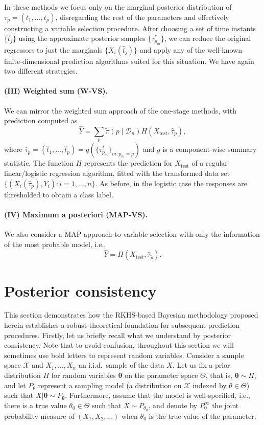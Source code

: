 \documentclass{article}
\numberwithin{equation}{section}
\theoremstyle{plain}
\theoremstyle{definition}
\begin{document}
In these methods we focus only on the marginal posterior distribution of \(\tau_p = (t_1, \dots, t_p)\), disregarding the rest of the parameters and effectively constructing a variable selection procedure. After choosing a set of time instants \(\{\hat t_j\}\) using the approximate posterior samples \(\{\tau^*_{p_m}\}\), we can reduce the original regressors to just the marginals \(\{X_i(\hat t_j)\}\) and apply any of the well-known finite-dimensional prediction algorithms suited for this situation. We have again two different strategies.

\paragraph*{(III) Weighted sum (W-VS).} We can mirror the weighted sum approach of the one-stage methods,  with prediction computed as
\[
\hat Y = \sum_{p} \tilde\pi(p\mid \mathcal D_n) H(X_{\text{test}}, \hat \tau_{p}),
\]
where \(\hat \tau_{p}=(\hat t_1, \dots ,\hat t_p)=g(\{\tau^*_{p_m}\}_{m:p_m=p})\) and \(g\) is a component-wise summary statistic. The function \(H\) represents the prediction for \(X_{\text{test}}\) of a regular linear/logistic regression algorithm, fitted with the transformed data set \(\{(X_i(\hat \tau_p), Y_i): i=1,\dots,n\}\). As before, in the logistic case the responses are thresholded to obtain a class label.

\paragraph*{(IV) Maximum a posteriori (MAP-VS).} We also consider a MAP approach to variable selection with only the information of the most probable model, i.e., 
\[
\hat Y = H(X_{\text{test}}, \hat \tau_{\tilde p}).
\]


\section{Posterior consistency}\label{sec:consistency}

This section demonstrates how the RKHS-based Bayesian methodology proposed herein establishes a robust theoretical foundation for subsequent prediction procedures. Firstly, let us briefly recall what we understand by posterior consistency. Note that to avoid confusion, throughout this section we will sometimes use bold letters to represent random variables. Consider a sample space \(\mathcal X\) and \(X_1,\dots, X_n\) an i.i.d.\ sample of the data \(X\). Let us fix a prior distribution \(\Pi\) for random variables \(\bm\theta\) on the parameter space \(\Theta\), that is, \(\bm\theta \sim \Pi\), and let \(P_\theta\) represent a sampling model (a distribution  on \(\mathcal X\) indexed by \(\theta \in \Theta\)) such that \(X | \bm \theta \sim P_{\bm \theta}\). Furthermore, assume that the model is well-specified, i.e., there is a true value \(\theta_{0}\in\Theta\) such that \(X \sim P_{\theta_0}\), and denote by \(P_0^\infty\) the joint probability measure of \((X_1, X_2, \dots)\) when \(\theta_0\) is the true value of the parameter.
\end{document}
